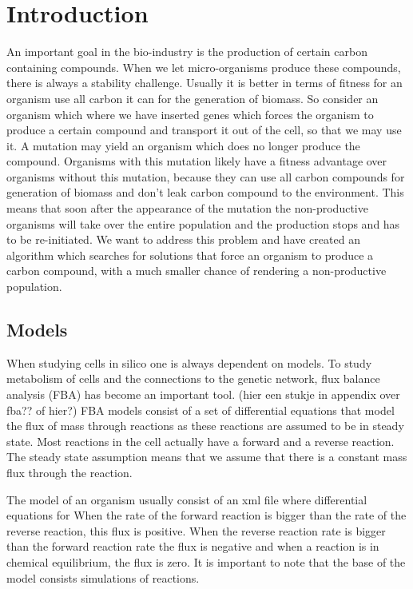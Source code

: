\documentclass[12pt]{report}
\begin{document}
\section{Introduction}
An important goal in the bio-industry is the production of certain carbon containing compounds. When we let micro-organisms produce these compounds, there is always a stability challenge. Usually it is better in terms of fitness for an organism use all carbon it can for the generation of biomass. So consider an organism which where we have inserted genes which forces the organism to produce a certain compound and transport it out of the cell, so that we may use it. A mutation may yield an organism which does no longer produce the compound. Organisms with this mutation likely have a fitness advantage over organisms without this mutation, because they can use all carbon compounds for generation of biomass and don't leak carbon compound to the environment. This means that soon after the appearance of the mutation the non-productive organisms will take over the entire population and the production stops and has to be re-initiated. We want to address this problem and have created an algorithm which searches for solutions that force an organism to produce a carbon compound, with a much smaller chance of rendering a non-productive population.

\subsection{Models}\label{sec:intro_models}
When studying cells in silico one is always dependent on models. To study metabolism of cells and the connections to the genetic network, flux balance analysis (FBA) has become an important tool. (hier een stukje in appendix over fba?? of hier?)
FBA models consist of a set of differential equations that model the flux of mass through reactions as these reactions are assumed to be in steady state. Most reactions in the cell actually have a forward and a reverse reaction. The steady state assumption means that we assume that there is a constant mass flux through the reaction.

The model of an organism usually consist of an xml file where differential equations for When the rate of the forward reaction is bigger than the rate of the reverse reaction, this flux is positive. When the reverse reaction rate is bigger than the forward reaction rate the flux is negative and when a reaction is in chemical equilibrium, the flux is zero.
It is important to note that the base of the model consists simulations of reactions.
\end{document}
